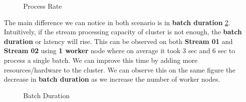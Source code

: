 \documentclass[12pt,a4paper]{report}
\begin{document}
\begin{figure}[h!]%
    \centering
    \qquad
    \caption{Process Rate}%
    \label{fig:process_rate}%
\end{figure}



The main difference we can notice in both scenario is in \textbf{batch duration} \ref{fig:batch_duration}. Intuitively, if the stream processing capacity of cluster is not enough, the \textbf{batch duration} or latency will rise. This can be observed on both \textbf{Stream 01} and \textbf{Stream 02} using \textbf{1 worker} node where on average it took 3 sec and 6 sec to process a single batch. We can improve this time by adding more resources/hardware to the cluster. We can observe this on the same figure the decrease in \textbf{batch duration} as we increase the number of worker nodes.

\begin{figure}[H]%
    \centering
    \qquad
    \caption{Batch Duration}%
    \label{fig:batch_duration}%
\end{figure}
\end{document}
